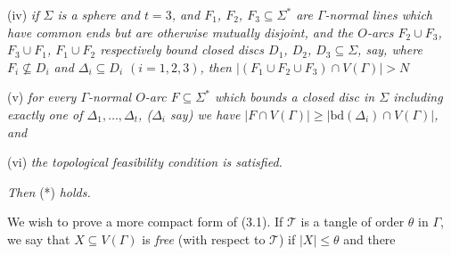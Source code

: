\hspace*{12pt}(iv) \textit{if $\Sigma$ is a sphere and $t = 3$, and $F_1$, $F_2$, $F_3 \subseteq \Sigma^*$ are $\Gamma$-normal lines which have common ends but are otherwise mutually disjoint, and the $O$-arcs $F_2 \cup F_3$, $F_3 \cup F_1$, $F_1 \cup F_2$ respectively bound closed discs $D_1$, $D_2$, $D_3 \subseteq \Sigma$, say, where $F_i \not\subseteq D_i$ and $\Delta_i \subseteq D_i$ $(i = 1, 2, 3)$, then $|(F_1 \cup F_2 \cup F_3) \cap V(\Gamma)| > N$}

\hspace*{12pt}(v) \textit{for every $\Gamma$-normal $O$-arc $F \subseteq \Sigma^*$ which bounds a closed disc in $\Sigma$ including exactly one of $\Delta_1, \dots, \Delta_t$, ($\Delta_i$ say) we have $|F \cap V(\Gamma)| \ge |\text{bd}(\Delta_i) \cap V(\Gamma)|$, and}

\hspace*{12pt}(vi) \textit{the topological feasibility condition is satisfied.}

\textit{Then} (*) \textit{holds.}

We wish to prove a more compact form of (3.1). If $\mathscr{T}$ is a tangle of order $\theta$ in $\Gamma$, we say that $X \subseteq V(\Gamma)$ is \textit{free} (with respect to $\mathscr{T}$) if $|X| \le \theta$ and there
